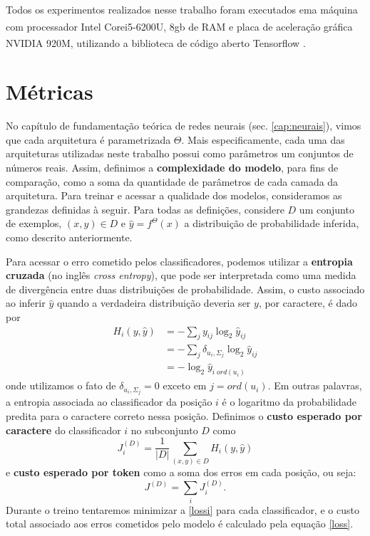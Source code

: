 Todos os experimentos realizados nesse trabalho foram executados ema máquina com processador Intel\textsuperscript{\textregistered} Core\texttrademark i5-6200U, 8gb de RAM e placa de aceleração gráfica NVIDIA\textsuperscript{\textregistered} 920M, utilizando a biblioteca de código aberto Tensorflow \cite{abadi2016tensorflow}.

\section{Métricas}

No capítulo de fundamentação teórica de redes neurais (sec. \ref{cap:neurais}), vimos que cada arquitetura é parametrizada $\Theta$. Mais especificamente, cada uma das arquiteturas utilizadas neste trabalho possui como parâmetros um conjuntos de números reais. Assim, definimos a \textbf{complexidade do modelo}, para fins de comparação, como a soma da quantidade de parâmetros de cada camada da arquitetura. Para treinar e acessar a qualidade dos modelos, consideramos as grandezas definidas à seguir. Para todas as definições, considere $D$ um conjunto de exemplos, $(x,y) \in D$ e $\hat{y} = f^{\Theta}(x)$ a distribuição de probabilidade inferida, como descrito anteriormente. 

Para acessar o erro cometido pelos classificadores, podemos utilizar a \textbf{entropia cruzada} (no inglês \textit{cross entropy}), que pode ser interpretada como uma medida de divergência entre duas distribuições de probabilidade. Assim, o custo associado ao inferir $\hat{y}$ quando a verdadeira distribuição deveria ser $y$, por caractere, é dado por
\begin{align}
	H_i(y, \hat{y}) &= -\sum_j y_{ij} \log_2{\hat{y}_{ij}} \\
					&= -\sum_j \delta_{u_i, \Sigma_{j}} \log_2{\hat{y}_{ij}} \\
					&= -\log_2{\hat{y}_{i\;ord(u_i)}}
\end{align}
onde utilizamos o fato de $\delta_{u_i, \Sigma_{j}} = 0$ exceto em $j = ord(u_i)$. Em outras palavras, a entropia associada ao classificador da posição $i$ é o logaritmo da probabilidade predita para o caractere correto nessa posição. Definimos o \textbf{custo esperado por caractere} do classificador $i$ no subconjunto $D$ como 
\begin{equation} \label{lossi} 
	J_i^{(D)} = \frac{1}{|D|} \sum_{(x,y) \in D} H_i(y, \hat{y})
\end{equation}
e \textbf{custo esperado por token} como a soma dos erros em cada posição, ou seja:
\begin{equation} \label{loss}
	J^{(D)} = \sum_{i} J_i^{(D)}.
\end{equation}
Durante o treino tentaremos minimizar a \ref{lossi} para cada classificador, e o custo total associado aos erros cometidos pelo modelo é calculado pela equação \ref{loss}.


